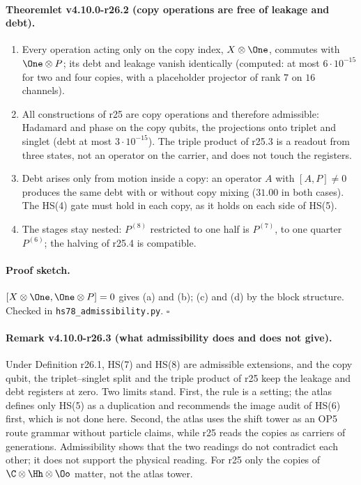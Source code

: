 \paragraph{Theoremlet v4.10.0-r26.2 (copy operations are free of leakage and debt).}
\begin{enumerate}[leftmargin=2em]
\item[(a)] Every operation acting only on the copy index, \(X\otimes\One\), commutes with \(\One\otimes P\); its debt and leakage vanish identically
(computed: at most \(6\cdot10^{-15}\) for two and four copies, with a placeholder projector of rank \(7\) on \(16\) channels).
\item[(b)] All constructions of r25 are copy operations and therefore admissible: Hadamard and phase on the copy qubits, the projections onto
triplet and singlet (debt at most \(3\cdot10^{-15}\)).  The triple product of r25.3 is a readout from three states, not an operator on the
carrier, and does not touch the registers.
\item[(c)] Debt arises only from motion inside a copy: an operator \(A\) with \([A,P]\ne0\) produces the same debt with or without copy mixing
(\(31.00\) in both cases).  The HS(4) gate must hold in each copy, as it holds on each side of HS(5).
\item[(d)] The stages stay nested: \(P^{(8)}\) restricted to one half is \(P^{(7)}\), to one quarter \(P^{(6)}\); the halving of r25.4 is compatible.
\end{enumerate}

\paragraph{Proof sketch.}
\([X\otimes\One,\One\otimes P]=0\) gives (a) and (b); (c) and (d) by the block structure.  Checked in \texttt{hs78\_\allowbreak admissibility.py}.  \(\square\)

\paragraph{Remark v4.10.0-r26.3 (what admissibility does and does not give).}
Under Definition r26.1, HS(7) and HS(8) are admissible extensions, and the copy qubit, the triplet--singlet split and the triple product of
r25 keep the leakage and debt registers at zero.  Two limits stand.  First, the rule is a setting; the atlas defines only HS(5) as a
duplication and recommends the image audit of HS(6) first, which is not done here.  Second, the atlas uses the shift tower as an OP5 route
grammar without particle claims, while r25 reads the copies as carriers of generations.  Admissibility shows that the two readings do not
contradict each other; it does not support the physical reading.  For r25 only the copies of \(\C\otimes\Hh\otimes\Oo\) matter, not the
atlas tower.

